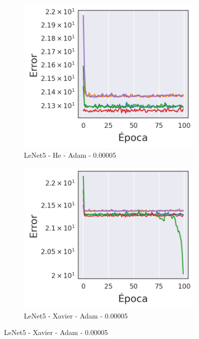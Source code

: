 \begin{figure}[H]
\centering
    \begin{subfigure}{.47\textwidth}
        \centering
        \includegraphics[width=1\linewidth]{imagenes/image_classification/original_dataset/loss2.png}
        \caption{LeNet5 - He - Adam - 0.00005}
    \end{subfigure}%
    \begin{subfigure}{.47\textwidth}
        \centering
        \includegraphics[width=1\linewidth]{imagenes/image_classification/original_dataset/loss3.png}
        \caption{LeNet5 - Xavier - Adam - 0.00005}
    \end{subfigure}%


\end{figure}
